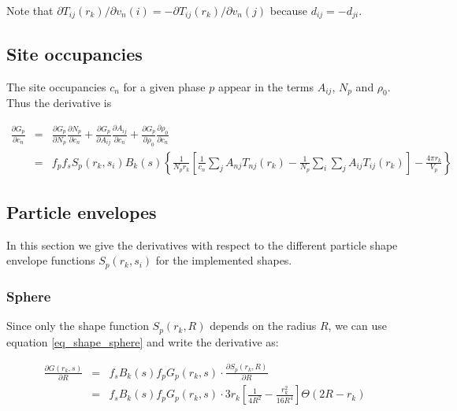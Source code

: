 \noindent
Note that $\partial T_{ij}(r_{k}) / \partial v_{n}(i) = - \partial
T_{ij}(r_{k}) / \partial v_{n}(j)$ because $d_{ij} = - d_{ji}$.


\subsection*{Site occupancies}

The site occupancies $c_{n}$ for a given phase $p$ appear in the
terms $A_{ij}$, $N_{p}$ and $\rho_{0}$. Thus the derivative is

\begin{eqnarray}
  \frac{\partial G_{p}}{\partial c_{n}} & = &
      \frac{\partial G_{p}} {\partial N_{p}}
      \frac{\partial N_{p}} {\partial c_{n}} +
      \frac{\partial G_{p}} {\partial A_{ij}}
      \frac{\partial A_{ij}}{\partial c_{n}} +
      \frac{\partial G_{p}} {\partial \rho_{0}}
      \frac{\partial \rho_{0}}{\partial c_{n}}\\
  & = & f_{p}f_{s} S_{p}(r_{k},s_{i}) B_{k}(s) \left \{
      \frac{1}{N_{p}r_{k}} \left [
      \frac{1}{c_{n}}\sum_{j}A_{nj}T_{nj}(r_{k}) -
      \frac{1}{N_{p}}\sum_{i}\sum_{j}A_{ij}T_{ij}(r_{k}) \right ] -
      \frac{4 \pi r_{k}}{V_{p}} \right \} \nonumber
  \label{eq_d/dc}
\end{eqnarray}


\subsection*{Particle envelopes}

In this section we give the derivatives with respect to the
different particle shape envelope functions $S_{p}(r_{k},s_{i})$ for
the implemented shapes.

\subsubsection*{Sphere}

Since only the shape function $S_{p}(r_{k},R)$ depends on the radius
$R$, we can use equation \ref{eq_shape_sphere} and write the
derivative as:

\begin{eqnarray}
  \frac{\partial G(r_{k},s)}{\partial R} & = &
     f_{s} B_{k}(s) f_{p} G_{p}(r_{k},s) \cdot
     \frac{\partial S_{p}(r_{k},R)}{\partial R} \nonumber \\
  & = &
     f_{s} B_{k}(s) f_{p} G_{p}(r_{k},s)
     \cdot 3 r_{k}
     \left [ \frac{1}{4 R^{2}} - \frac{r_{k}^{2}}{16 R^{4}}\right ]
     \Theta (2 R - r_{k})
\end{eqnarray}

